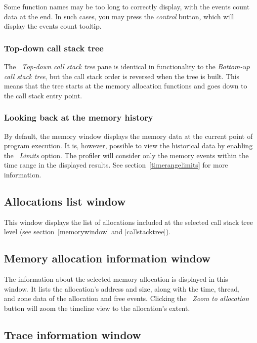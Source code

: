 \documentclass[hidelinks,titlepage,a4paper,twoside]{article}
\begin{document}
Some function names may be too long to correctly display, with the events count data at the end. In such cases, you may press the \emph{control} button, which will display the events count tooltip.

\subsubsection{Top-down call stack tree}

The \emph{\faTree\faArrowDown{}~Top-down call stack tree} pane is identical in functionality to the \emph{Bottom-up call stack tree}, but the call stack order is reversed when the tree is built. This means that the tree starts at the memory allocation functions and goes down to the call stack entry point.

\subsubsection{Looking back at the memory history}

By default, the memory window displays the memory data at the current point of program execution. It is, however, possible to view the historical data by enabling the \emph{\faRuler{}~Limits} option. The profiler will consider only the memory events within the time range in the displayed results. See section~\ref{timerangelimits} for more information.

\subsection{Allocations list window}
\label{alloclist}

This window displays the list of allocations included at the selected call stack tree level (see section~\ref{memorywindow} and \ref{callstacktree}).

\subsection{Memory allocation information window}
\label{memallocinfo}

The information about the selected memory allocation is displayed in this window. It lists the allocation's address and size, along with the time, thread, and zone data of the allocation and free events. Clicking the \emph{\faMicroscope{}~Zoom to allocation} button will zoom the timeline view to the allocation's extent.

\subsection{Trace information window}
\label{traceinfo}
\end{document}
